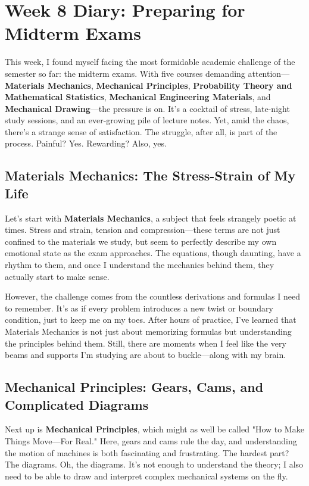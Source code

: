 \documentclass[a4paper]{article} 	%
\begin{document}
\section{Week 8 Diary: Preparing for Midterm Exams}

This week, I found myself facing the most formidable academic challenge of the semester so far: the midterm exams. With five courses demanding attention—\textbf{Materials Mechanics}, \textbf{Mechanical Principles}, \textbf{Probability Theory and Mathematical Statistics}, \textbf{Mechanical Engineering Materials}, and \textbf{Mechanical Drawing}—the pressure is on. It's a cocktail of stress, late-night study sessions, and an ever-growing pile of lecture notes. Yet, amid the chaos, there’s a strange sense of satisfaction. The struggle, after all, is part of the process. Painful? Yes. Rewarding? Also, yes.

\subsection*{Materials Mechanics: The Stress-Strain of My Life}

Let's start with \textbf{Materials Mechanics}, a subject that feels strangely poetic at times. Stress and strain, tension and compression—these terms are not just confined to the materials we study, but seem to perfectly describe my own emotional state as the exam approaches. The equations, though daunting, have a rhythm to them, and once I understand the mechanics behind them, they actually start to make sense. 

However, the challenge comes from the countless derivations and formulas I need to remember. It's as if every problem introduces a new twist or boundary condition, just to keep me on my toes. After hours of practice, I've learned that Materials Mechanics is not just about memorizing formulas but understanding the principles behind them. Still, there are moments when I feel like the very beams and supports I’m studying are about to buckle—along with my brain.

\subsection*{Mechanical Principles: Gears, Cams, and Complicated Diagrams}

Next up is \textbf{Mechanical Principles}, which might as well be called "How to Make Things Move—For Real." Here, gears and cams rule the day, and understanding the motion of machines is both fascinating and frustrating. The hardest part? The diagrams. Oh, the diagrams. It’s not enough to understand the theory; I also need to be able to draw and interpret complex mechanical systems on the fly.
\end{document}
